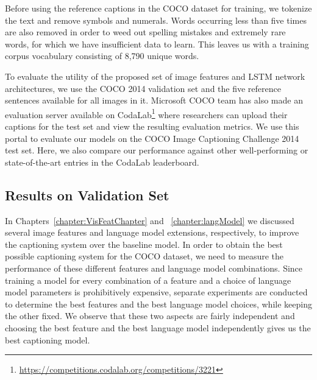 Before using the reference captions in the COCO dataset for training, we
tokenize the text and remove symbols and numerals.
Words occurring less than five times are also removed in order to weed out spelling
mistakes and extremely rare words, for which we have insufficient data to learn.
This leaves us with a training corpus vocabulary consisting of 8,790 unique words. 

To evaluate the utility of the proposed set of image features and LSTM network
architectures, we use the COCO 2014 validation set and the five reference
sentences available for all images in it.
Microsoft COCO team has also made an evaluation server available on
CodaLab\footnote{\url{https://competitions.codalab.org/competitions/3221}} where
researchers can upload their captions for the test set and view the resulting
evaluation metrics.
We use this portal to evaluate our models on the COCO Image Captioning Challenge
2014 test set. 
Here, we also compare our performance against other well-performing or
state-of-the-art entries in the CodaLab leaderboard.

\subsection{Results on Validation Set}
In Chapters~\ref{chapter:VisFeatChapter} and ~\ref{chapter:langModel} we
discussed several image features and language model extensions, respectively, to
improve the captioning system over the baseline model.
In order to obtain the best possible captioning system for the COCO dataset, we
need to measure the performance of these different features and language model
combinations.
Since training a model for every combination of a feature and a choice of
language model parameters is prohibitively expensive, separate experiments are
conducted to determine the best features and the best language model choices,
while keeping the other fixed.
We observe that these two aspects are fairly independent and choosing the best
feature and the best language model independently  gives us the best captioning
model.

